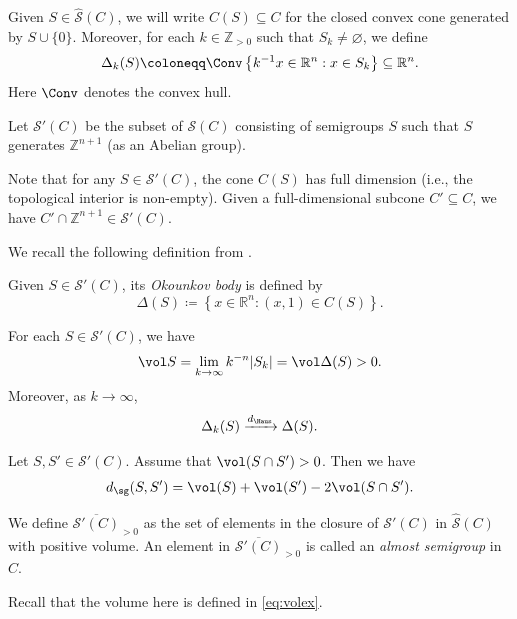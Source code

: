 Given $S\in \hat{\mathcal{S}}(C)$, we will write $C(S)\subseteq C$ for the closed convex cone generated by $S\cup \{0\}$. Moreover, for each $k\in \mathbb{Z}_{>0}$ such that $S_k\neq\varnothing$, we define
\[
\Delta_k(S)\coloneqq \Conv \left\{k^{-1}x\in \mathbb{R}^n:x\in S_k \right\}\subseteq \mathbb{R}^n.
\]
Here $\Conv$ denotes the convex hull.
\begin{definition}\label{def:Okounkov:L69}
    Let $\mathcal{S}'(C)$ be the subset of $\mathcal{S}(C)$ consisting of semigroups $S$ such that $S$ generates $\mathbb{Z}^{n+1}$ (as an Abelian group).
\end{definition}
Note that for any $S\in \mathcal{S}'(C)$, the cone $C(S)$ has full dimension (i.e., the topological interior is non-empty). Given a full-dimensional subcone $C'\subseteq C$, we have $C'\cap \mathbb{Z}^{n+1}\in \mathcal{S}'(C)$.


We recall the following definition from \cite{KK12}.
\begin{definition}\label{def:Okokk}
 Given $S\in \mathcal{S}'(C)$, its \emph{Okounkov body} is defined by
\[
\Delta(S)\coloneqq \left\{x\in \mathbb{R}^n:(x,1)\in C(S) \right\}.
\]
\end{definition}

\begin{theorem}\label{thm:HausOkoun}
	For each $S\in \mathcal{S}'(C)$, we have
	\begin{equation}\label{eq:volWvolDelta}
		\vol S=\lim_{k\to\infty} k^{-n}|S_k|=\vol \Delta(S)>0.
	\end{equation}
    Moreover, as $k\to\infty$,
	\begin{equation}\label{eq:HausconvDeltaGLS}
		\Delta_{k}(S)\xrightarrow{d_{\Haus}}\Delta(S).
	\end{equation}
\end{theorem}
\begin{corollary}\label{cor:dist}
    Let $S,S'\in \mathcal{S}'(C)$. Assume that $\vol (S\cap S')>0$. Then we have
    \[
    d_{\sg}(S,S')=\vol(S)+\vol(S')-2\vol(S\cap S').
    \]
\end{corollary}

\begin{definition}\label{def:SpCbar}
    We define $\overline{\mathcal{S}'(C)}_{>0}$ as the set of elements in the closure of $\mathcal{S}'(C)$ in $\hat{\mathcal{S}}(C)$ with positive volume. An element in $\overline{\mathcal{S}'(C)}_{>0}$ is called an \emph{almost semigroup} in $C$.
\end{definition}
Recall that the volume here is defined in \eqref{eq:volex}.



